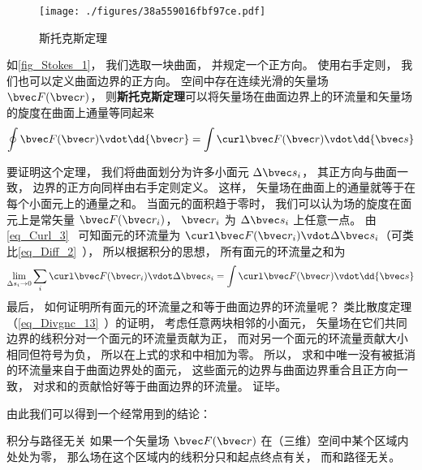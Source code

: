 
\begin{issues}
\issueTODO
\end{issues}


\begin{figure}[ht]
\centering
\texttt{[image: ./figures/38a559016fbf97ce.pdf]}
\caption{斯托克斯定理} \label{fig_Stokes_1}
\end{figure}

如\autoref{fig_Stokes_1}， 我们选取一块曲面， 并规定一个正方向。 使用右手定则， 我们也可以定义曲面边界的正方向。 空间中存在连续光滑的矢量场 $\bvec F(\bvec r)$， 则\textbf{斯托克斯定理}可以将矢量场在曲面边界上的环流量和矢量场的旋度在曲面上通量等同起来
\begin{equation}\label{eq_Stokes_1}
\oint \bvec F(\bvec r) \vdot \dd{\bvec r} = \int \curl \bvec F(\bvec r) \vdot \dd{\bvec s}
\end{equation}

要证明这个定理， 我们将曲面划分为许多小面元 $\Delta \bvec s_i$， 其正方向与曲面一致， 边界的正方向同样由右手定则定义。 这样， 矢量场在曲面上的通量就等于在每个小面元上的通量之和。 当面元的面积趋于零时， 我们可以认为场的旋度在面元上是常矢量 $\bvec F(\bvec r_i)$， $\bvec r_i$ 为 $\Delta \bvec s_i$ 上任意一点。 由\autoref{eq_Curl_3}~ 可知面元的环流量为 $\curl\bvec F(\bvec r_i) \vdot \Delta \bvec s_i$（可类比\autoref{eq_Diff_2}~）， 所以根据积分的思想， 所有面元的环流量之和为
\begin{equation}
\lim_{\Delta s_i \to 0}\sum_i \curl\bvec F(\bvec r_i) \vdot \Delta \bvec s_i = \int \curl\bvec F(\bvec r) \vdot \dd{\bvec s}
\end{equation}
最后， 如何证明所有面元的环流量之和等于曲面边界的环流量呢？ 类比散度定理（\autoref{eq_Divgnc_13}~）的证明， 考虑任意两块相邻的小面元， 矢量场在它们共同边界的线积分对一个面元的环流量贡献为正， 而对另一个面元的环流量贡献大小相同但符号为负， 所以在上式的求和中相加为零。 所以， 求和中唯一没有被抵消的环流量来自于曲面边界处的面元， 这些面元的边界与曲面边界重合且正方向一致， 对求和的贡献恰好等于曲面边界的环流量。 证毕。

由此我们可以得到一个经常用到的结论：
\begin{theorem}{积分与路径无关}
如果一个矢量场 $\bvec F(\bvec r)$ 在（三维）空间中某个区域内处处为零， 那么场在这个区域内的线积分只和起点终点有关， 而和路径无关。
\end{theorem}

